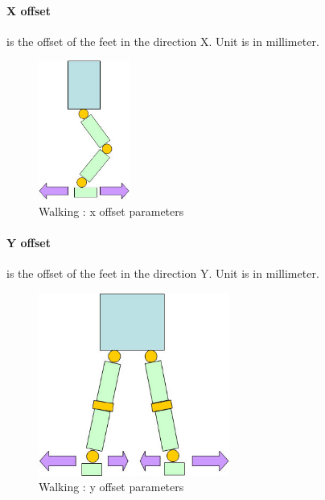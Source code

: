 \documentclass[a4paper, 12pt]{article}  		%
\begin{document}
\paragraph*{X offset}
is the offset of the feet in the direction X. Unit is in millimeter.
\begin{figure}[H]
\begin{center}
\includegraphics[width=3cm]{x_offset.jpg}
\caption{Walking : x offset parameters}
\label{x_offset}
\end{center}
\end{figure}

\paragraph*{Y offset}
is the offset of the feet in the direction Y. Unit is in millimeter.
\begin{figure}[H]
\begin{center}
\includegraphics[height=6cm]{y_offset.jpg}
\caption{Walking : y offset parameters}
\label{y_offset}
\end{center}
\end{figure}

\newpage
\end{document}
